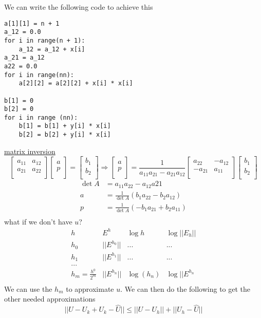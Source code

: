\documentclass[10pt]{article}
\newcommand{\1}{\mathbb{1}}
\begin{document}
We can write the following code to achieve this
\begin{verbatim}
a[1][1] = n + 1
a_12 = 0.0
for i in range(n + 1):
    a_12 = a_12 + x[i]
a_21 = a_12
a22 = 0.0
for i in range(nn):
    a[2][2] = a[2][2] + x[i] * x[i]

b[1] = 0
b[2] = 0
for i in range (nn):
    b[1] = b[1] + y[i] * x[i]
    b[2] = b[2] + y[i] * x[i]
    \end{verbatim}

\underline{matrix inversion}\\
\[\begin{bmatrix}
    a_{11} & a_{12}\\
    a_{21} & a_{22}\\
\end{bmatrix}
\begin{bmatrix}
    a\\
    p\\
\end{bmatrix}
=
\begin{bmatrix}
    b_1\\
    b_2\\
\end{bmatrix}
\Rightarrow
\begin{bmatrix}
    a\\
    p\\
\end{bmatrix}
=
\frac{1}{a_{11}a_{21} - a_{21}a_{12}}
\begin{bmatrix}
    a_{22} & -a_{12}\\
    -a_{21} & a_{11}\\
\end{bmatrix}
\begin{bmatrix}
    b_1\\
    b_2\\
\end{bmatrix}
\]
\begin{align*}
    \det A &= a_{11}a_{22} - a_{12}a{21}\\
    a &= \frac{1}{\det A} (b_1 a_{22} - b_2 a_{12})\\
    p &= \frac{1}{\det A} (-b_1 a_{21} + b_2 a_{11})\\
\end{align*}
what if we don't have $u$?
\[\begin{matrix}
        h & E^h & \log h &\log||E_h||\\
        \hline
        h_0 & ||E^{h_0}|| & ... & ...\\
        h_1 & ||E^{h_1}|| & ... & ...\\
        ...\\
        h_m = \frac{h^0}{2^m} & ||E^{h_n}|| & \log(h_n) & \log||E^{h_n}\\
    \end{matrix}\]
We can use the $h_m$ to approximate $u$. We can then do the following to get the other needed approximations
\[||U - U_k + U_k - \hat{U}|| \leq ||U - U_h|| + ||U_h - \hat{U}||\]
\end{document}
